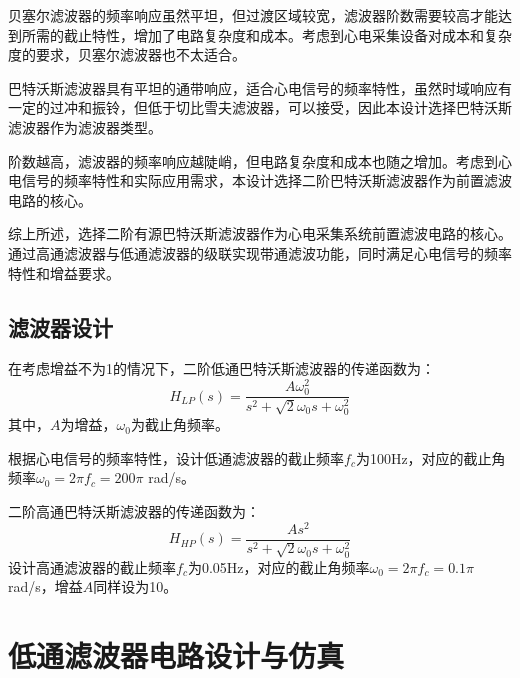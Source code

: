 \documentclass[10pt,a4paper]{ctexart}
\newcommand{\myspace}[1]{\par\vspace{#1\baselineskip}} %
\begin{document}
贝塞尔滤波器的频率响应虽然平坦，但过渡区域较宽，滤波器阶数需要较高才能达到所需的截止特性，增加了电路复杂度和成本。考虑到心电采集设备对成本和复杂度的要求，贝塞尔滤波器也不太适合。

巴特沃斯滤波器具有平坦的通带响应，适合心电信号的频率特性，虽然时域响应有一定的过冲和振铃，但低于切比雪夫滤波器，可以接受，因此本设计选择巴特沃斯滤波器作为滤波器类型。

阶数越高，滤波器的频率响应越陡峭，但电路复杂度和成本也随之增加。考虑到心电信号的频率特性和实际应用需求，本设计选择二阶巴特沃斯滤波器作为前置滤波电路的核心。

综上所述，选择二阶有源巴特沃斯滤波器作为心电采集系统前置滤波电路的核心。通过高通滤波器与低通滤波器的级联实现带通滤波功能，同时满足心电信号的频率特性和增益要求。
\subsection{滤波器设计}
在考虑增益不为1的情况下，二阶低通巴特沃斯滤波器的传递函数为：
\begin{equation}
H_{LP}(s) = \frac{A \omega_0^2}{s^2 + \sqrt{2} \omega_0 s + \omega_0^2}
\end{equation}
其中，$A$为增益，$\omega_0$为截止角频率。

根据心电信号的频率特性，设计低通滤波器的截止频率$f_c$为100Hz，对应的截止角频率$\omega_0 = 2 \pi f_c = 200 \pi$ rad/s。

二阶高通巴特沃斯滤波器的传递函数为：
\begin{equation}
H_{HP}(s) = \frac{A s^2}{s^2 + \sqrt{2} \omega_0 s + \omega_0^2}
\end{equation}
设计高通滤波器的截止频率$f_c$为0.05Hz，对应的截止角频率$\omega_0 = 2 \pi f_c = 0.1 \pi$ rad/s，增益$A$同样设为10。
\myspace{2}

\section{低通滤波器电路设计与仿真}
\end{document}

